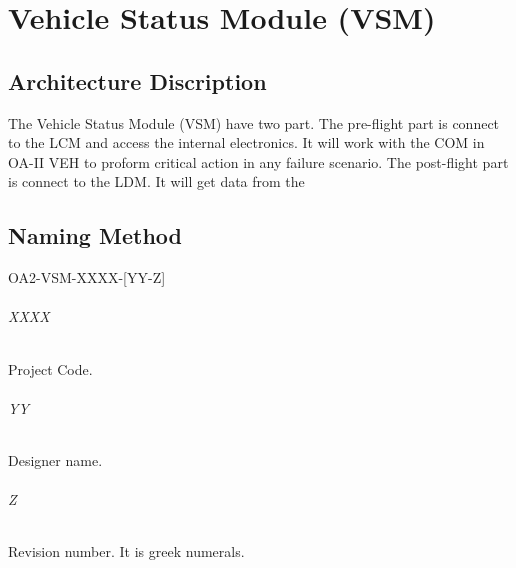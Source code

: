\documentclass[12pt,article]{memoir}
\begin{document}
\newpage

\chapter{Vehicle Status Module (VSM)}
\section{Architecture Discription}
The Vehicle Status Module (VSM) have two part. The pre-flight part is connect to the LCM and access the internal electronics. It will work with the COM in OA-II VEH to proform critical action in any failure scenario. The post-flight part is connect to the LDM. It will get data from the
\section{Naming Method} 
\begin{LARGE}
OA2-VSM-XXXX-[YY-Z]
\end{LARGE}
\subparagraph{XXXX}
Project Code.
\subparagraph{YY}
Designer name.
\subparagraph{Z}
Revision number. It is greek numerals.
\end{document}
